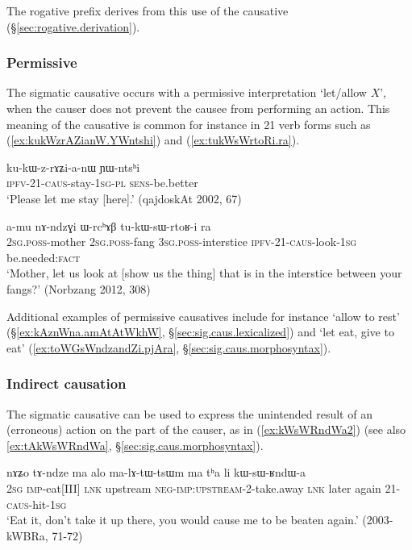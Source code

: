The rogative  prefix derives from this use of the causative (§\ref{sec:rogative.derivation}). 

\subsubsection{Permissive} \label{sec:sig.caus.permissive} 
The sigmatic causative occurs with a permissive interpretation `let/allow $X$', when the causer does not prevent the causee from performing an action. This meaning of the causative is common for instance in 2\fl{}1 verb forms such as (\ref{ex:kukWzrAZianW.YWntshi}) and (\ref{ex:tukWsWrtoRi.ra}). 

\begin{exe}
\ex \label{ex:kukWzrAZianW.YWntshi}
\gll ku-kɯ-z-rɤʑi-a-nɯ ɲɯ-ntsʰi \\
\textsc{ipfv}-2\fl{}1-\textsc{caus}-stay-\textsc{1sg}-\textsc{pl} \textsc{sens}-be.better \\
\glt `Please let me stay [here].' (qajdoskAt 2002, 67)
\end{exe}
 
\begin{exe}
\ex \label{ex:tukWsWrtoRi.ra}
\gll a-mu nɤ-ndzɣi ɯ-rcʰɤβ tu-kɯ-sɯ-rtoʁ-i ra \\
\textsc{2sg}.\textsc{poss}-mother \textsc{2sg}.\textsc{poss}-fang \textsc{3sg}.\textsc{poss}-interstice \textsc{ipfv}-2\fl{}1-\textsc{caus}-look-\textsc{1sg} be.needed:\textsc{fact} \\
\glt `Mother, let us look at [show us the thing] that is in the interstice between your fangs?' (Norbzang 2012, 308)
\end{exe}

Additional examples of permissive causatives include for instance   `allow to rest' (§\ref{ex:kAznWna.amAtAtWkhW}, §\ref{sec:sig.caus.lexicalized}) and  `let eat, give to eat' (\ref{ex:toWGsWndzandZi.pjAra}, §\ref{sec:sig.caus.morphosyntax}).
 
\subsubsection{Indirect causation} \label{sec:sig.caus.indirect}
The sigmatic causative can be used to express the unintended result of an (erroneous) action on the part of the causer,  as in (\ref{ex:kWsWRndWa2}) (see also \ref{ex:tAkWsWRndWa}, §\ref{sec:sig.caus.morphosyntax}).

\begin{exe}
\ex \label{ex:kWsWRndWa2}
\gll  nɤʑo tɤ-ndze ma alo ma-lɤ-tɯ-tsɯm ma tʰa li kɯ-sɯ-ʁndɯ-a \\
\textsc{2sg} \textsc{imp}-eat[III] \textsc{lnk} upstream \textsc{neg}-\textsc{imp}:\textsc{upstream}-2-take.away \textsc{lnk} later again 2\fl{}1-\textsc{caus}-hit-\textsc{1sg} \\
\glt  `Eat it, don't take it up there, you would cause me to be beaten again.' (2003-kWBRa, 71-72)
\end{exe}

